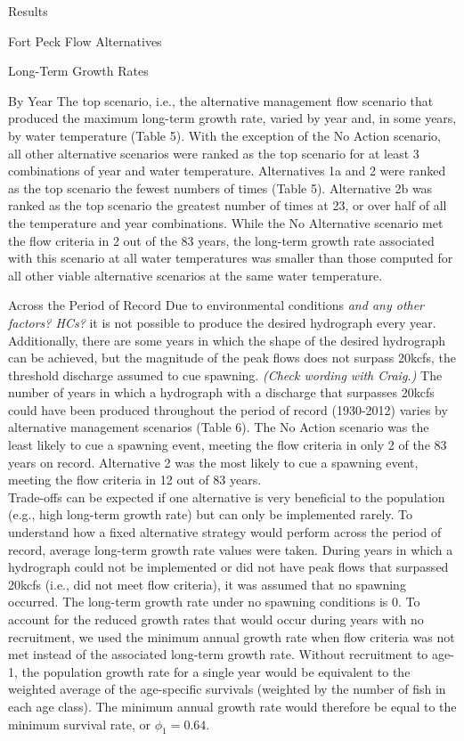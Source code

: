 \documentclass[12pt]{article}
\begin{document}
\begin{section}{Results}
\begin{subsection}{Fort Peck Flow Alternatives}
\begin{subsubsection}{Long-Term Growth Rates}
\begin{paragraph}{By Year}
The top scenario, i.e., the alternative management flow scenario that produced the maximum long-term growth rate, varied by year and, in some years, by water temperature (Table 5).  With the exception of the No Action scenario, all other alternative scenarios were ranked as the top scenario for at least 3 combinations of year and water temperature.  Alternatives 1a and 2 were ranked as the top scenario the fewest numbers of times (Table 5).  %
Alternative 2b was ranked as the top scenario the greatest number of times at 23, or over half of all the temperature and year combinations.  While the No Alternative scenario met the flow criteria in 2 out of the 83 years, the long-term growth rate associated with this scenario at all water temperatures was smaller than those computed for all other viable alternative scenarios at the same water temperature.  
\end{paragraph}
\begin{paragraph}{Across the Period of Record}
Due to environmental conditions \textit{and any other factors? HCs?} it is not possible to produce the desired hydrograph every year.  Additionally, there are some years in which the shape of the desired hydrograph can be achieved, but the magnitude of the peak flows does not surpass 20kcfs, the threshold discharge assumed to cue spawning. \textit{(Check wording with Craig.)}  The number of years in which a hydrograph with a discharge that surpasses 20kcfs could have been produced throughout the period of record (1930-2012) varies by alternative management scenarios (Table 6).  The No Action scenario was the least likely to cue a spawning event, meeting the flow criteria in only 2 of the 83 years on record.  Alternative 2 was the most likely to cue a spawning event, meeting the flow criteria in 12 out of 83 years.\\   

Trade-offs can be expected if one alternative is very beneficial to the population (e.g., high long-term growth rate) but can only be implemented rarely.  To understand how a fixed alternative strategy would perform across the period of record, average long-term growth rate values were taken.  During years in which a hydrograph could not be implemented or did not have peak flows that surpassed 20kcfs (i.e., did not meet flow criteria), it was assumed that no spawning occurred.  The long-term growth rate under no spawning conditions is $0$.  To account for the reduced growth rates that would occur during years with no recruitment, we used the minimum annual growth rate when flow criteria was not met instead of the associated long-term growth rate.  Without recruitment to age-1, the population growth rate for a single year would be equivalent to the weighted average of the age-specific survivals (weighted by the number of fish in each age class).  The minimum annual growth rate would therefore be equal to the minimum survival rate, or $\phi_1=0.64$.\\


\end{paragraph}
\end{subsubsection}
\end{subsection}
\end{section}
\end{document}

